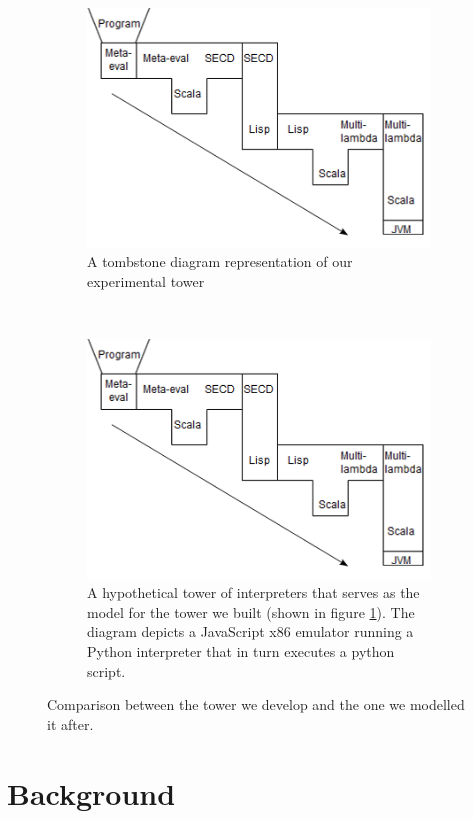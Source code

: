 \documentclass[a4paper,12pt,twoside,openright]{report}
\theoremstyle{definition}
\begin{document}
\begin{figure}[htp!]
\centering
    \begin{subfigure}{0.5\linewidth}
    	\centering
    	\includegraphics[scale=2]{tombstone_tower.png}
    	\caption{A tombstone diagram representation of our experimental tower}
    	\label{fig:tombstone}
    \end{subfigure}\\[1ex]
    \par\bigskip
    \begin{subfigure}{0.5\linewidth}
        \centering
        \includegraphics[scale=2]{tombstone_practical.png}
        \caption{A hypothetical tower of interpreters that serves as the model for the tower we built (shown in figure \ref{fig:tombstone}). The diagram depicts a JavaScript x86 emulator running a Python interpreter that in turn executes a python script.}
        \label{fig:tombstone_practical}
    \end{subfigure}
\caption{Comparison between the tower we develop and the one we modelled it after.}
\label{fig:tombstone_all}
\end{figure}

\section{Background}\label{sec:background}
\end{document}
